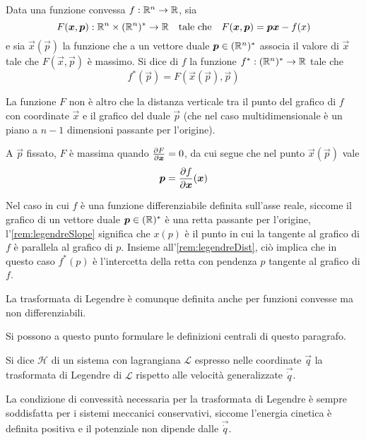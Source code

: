 \begin{definition}
  Data una funzione convessa $f:\mathbb{R}^{n}\to \mathbb{R}$, sia \begin{equation*}
  F(\vec{x},\vec{p}): \R^{n} \times (\R^{n})^* \to \R \qqtext{tale che} F(\vec{x},\vec{p}) = \vec{p}\vec{x} - f(x)
  \end{equation*} 
  e sia $\vec{x}(\vec{p})$ la funzione che a un vettore duale $\boldsymbol{p} \in (\mathbb{R}^{n})^*$ associa il valore di $\vec{x}$ tale che $F(\vec{x},\vec{p})$ è massimo. Si dice  di $f$ la funzione $f^*:(\mathbb{R}^{n})^* \to \mathbb{R}$ tale che \begin{equation*}
  f^*(\vec{p}) = F(\vec{x}(\vec{p}), \vec{p})
  \end{equation*} 
\end{definition}
\begin{remark} \label{rem:legendreDist}
  La funzione $F$ non è altro che la distanza verticale tra il punto del grafico di $f$ con coordinate $\vec{x}$ e il grafico del duale $\vec{p}$ (che nel caso multidimensionale è un piano a $n-1$ dimensioni passante per l'origine). 
\end{remark}
\begin{remark} \label{rem:legendreSlope}
  A $\vec{p}$ fissato, $F$ è massima quando $\pdv{F}{\boldsymbol{x}}=0$, da cui segue che nel punto $\vec{x}(\vec{p})$ vale \begin{equation*}
    \boldsymbol{p}=\pdv{f}{\boldsymbol{x}}()(\boldsymbol{x})
  \end{equation*}
\end{remark}
\begin{remark}
  Nel caso in cui $f$ è una funzione differenziabile definita sull'asse reale, siccome il grafico di un vettore duale $\boldsymbol{p} \in  (\mathbb{R})^*$ è una retta passante per l'origine, l'\autoref{rem:legendreSlope} significa che $x(p)$ è il punto in cui la tangente al grafico di $f$ è parallela al grafico di $p$. Insieme all'\autoref{rem:legendreDist}, ciò implica che in questo caso $f^*(p)$ è l'intercetta della retta con pendenza $p$ tangente al grafico di $f$.
\end{remark}
\begin{remark}
  La trasformata di Legendre è comunque definita anche per funzioni convesse ma non differenziabili.
\end{remark}

Si possono a questo punto formulare le definizioni centrali di questo paragrafo.
\begin{definition}
  Si dice  $\mathcal{H}$ di un sistema con lagrangiana $\mathcal{L}$ espresso nelle coordinate $\vec{q}$ la trasformata di Legendre di $\mathcal{L}$ rispetto alle velocità generalizzate $\vec{\dot{q}}$. 
\end{definition}
\begin{remark}
  La condizione di convessità necessaria per la trasformata di Legendre è sempre soddisfatta per i sistemi meccanici conservativi, siccome l'energia cinetica è definita positiva e il potenziale non dipende dalle $\vec{\dot{q}}$.
\end{remark}

